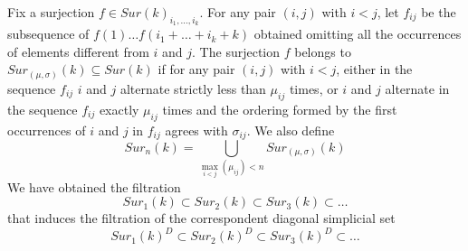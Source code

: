 	\begin{definition}
		Fix a surjection $f\in Sur(k)_{i_{1},\dots,i_{k}}$. For any pair $(i,j)$ with $i< j$, let $f_{ij}$ be the subsequence of $f(1) \dots f(i_1+\dots+i_k+k)$ obtained omitting all the occurrences of elements different from $i$ and $j$. 
		The surjection $f$ belongs to $Sur_{(\mu,\sigma)}(k)\subseteq Sur(k)$ if for any pair $(i,j)$ with $i< j$, either in the sequence $f_{ij}$ $i$ and $j$ alternate strictly less than $\mu_{ij}$ times,
		 or $i$ and $j$ alternate in the sequence $f_{ij}$  exactly $\mu_{ij}$ times and the ordering formed by the first occurrences of $i$ and $j$ in $f_{ij}$ agrees with $\sigma_{ij}$. We also define \begin{equation*}
		 	\label{def}
		 	Sur_{n}(k)=\bigcup_{\max_{i<j}(\mu_{ij})< n} Sur_{(\mu,\sigma)}(k)
		 \end{equation*}
	    We have obtained the filtration $$Sur_1(k) \subset Sur_2(k)  \subset Sur_3(k)  \subset \dots $$
	    that induces the filtration of the correspondent diagonal simplicial set 
	    $$Sur_1(k)^{D} \subset Sur_2(k)^{D}  \subset Sur_3(k)^{D}  \subset\dots $$
	    
	\end{definition}

